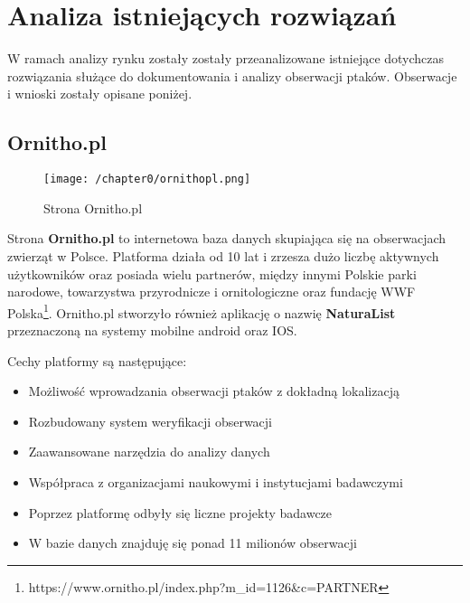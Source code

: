 %


\chapter{Analiza istniejących rozwiązań}
\label{rozdzial0}

W ramach analizy rynku zostały zostały przeanalizowane istniejące dotychczas rozwiązania służące do dokumentowania i analizy obserwacji ptaków. 
Obserwacje i wnioski zostały opisane poniżej.

\section{Ornitho.pl}

\begin{figure}[!htb]
	\centering
	\texttt{[image: /chapter0/ornithopl.png]}
	\caption{Strona Ornitho.pl}
	\label{fig:ornitho.pl}
\end{figure}

Strona \textbf{Ornitho.pl}\cite{Ornitho.pl} to internetowa baza danych skupiająca się na obserwacjach zwierząt w Polsce. Platforma działa od 10 lat i zrzesza dużo liczbę aktywnych użytkowników oraz posiada wielu partnerów, między innymi Polskie parki narodowe, towarzystwa przyrodnicze i ornitologiczne oraz fundację WWF Polska\footnote{https://www.ornitho.pl/index.php?m\_id=1126\&c=PARTNER}. Ornitho.pl stworzyło również aplikację o nazwię \textbf{NaturaList} przeznaczoną na systemy mobilne android oraz IOS.

Cechy platformy są następujące:

\begin{itemize}
	\item Możliwość wprowadzania obserwacji ptaków z dokładną lokalizacją
	\item Rozbudowany system weryfikacji obserwacji
	\item Zaawansowane narzędzia do analizy danych
	\item Współpraca z organizacjami naukowymi i instytucjami badawczymi
	\item Poprzez platformę odbyły się liczne projekty badawcze
	\item W bazie danych znajduję się ponad 11 milionów obserwacji
\end{itemize}

